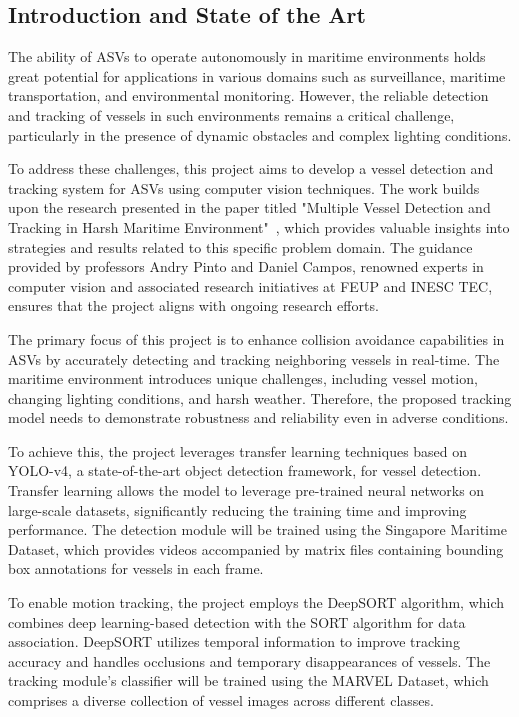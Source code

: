 \documentclass[a4paper,12pt]{article}
\begin{document}
\begin{multicols}{2}

\section{Introduction and State of the Art}
The ability of ASVs to operate autonomously in maritime environments holds great potential for applications in various domains such as surveillance, maritime transportation, and environmental monitoring. However, the reliable detection and tracking of vessels in such environments remains a critical challenge, particularly in the presence of dynamic obstacles and complex lighting conditions.

To address these challenges, this project aims to develop a vessel detection and tracking system for ASVs using computer vision techniques. The work builds upon the research presented in the paper titled "Multiple Vessel Detection and Tracking in Harsh Maritime Environment"~\cite{MVDTHME}, which provides valuable insights into strategies and results related to this specific problem domain. The guidance provided by professors Andry Pinto and Daniel Campos, renowned experts in computer vision and associated research initiatives at FEUP and INESC TEC, ensures that the project aligns with ongoing research efforts.

The primary focus of this project is to enhance collision avoidance capabilities in ASVs by accurately detecting and tracking neighboring vessels in real-time. The maritime environment introduces unique challenges, including vessel motion, changing lighting conditions, and harsh weather. Therefore, the proposed tracking model needs to demonstrate robustness and reliability even in adverse conditions.

To achieve this, the project leverages transfer learning techniques based on YOLO-v4, a state-of-the-art object detection framework, for vessel detection. Transfer learning allows the model to leverage pre-trained neural networks on large-scale datasets, significantly reducing the training time and improving performance. The detection module will be trained using the Singapore Maritime Dataset, which provides videos accompanied by matrix files containing bounding box annotations for vessels in each frame.

To enable motion tracking, the project employs the DeepSORT algorithm, which combines deep learning-based detection with the SORT algorithm for data association. DeepSORT utilizes temporal information to improve tracking accuracy and handles occlusions and temporary disappearances of vessels. The tracking module's classifier will be trained using the MARVEL Dataset, which comprises a diverse collection of vessel images across different classes.


\end{multicols}
\end{document}
